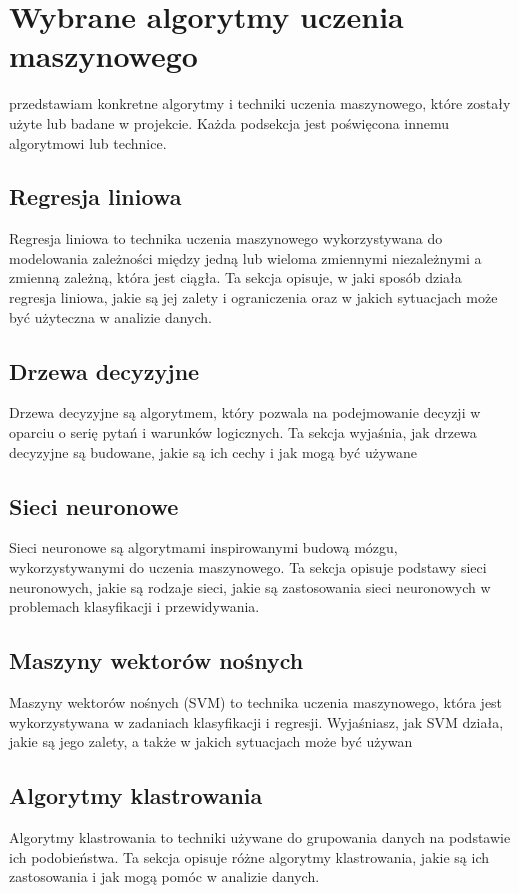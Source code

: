 \newpage %
\section{Wybrane algorytmy uczenia maszynowego}
 przedstawiam konkretne algorytmy i techniki uczenia maszynowego, które zostały użyte lub badane w  projekcie. Każda podsekcja jest poświęcona innemu algorytmowi lub technice. 

\subsection{Regresja liniowa}
Regresja liniowa to technika uczenia maszynowego wykorzystywana do modelowania zależności między jedną lub wieloma zmiennymi niezależnymi a zmienną zależną, która jest ciągła. Ta sekcja opisuje, w jaki sposób działa regresja liniowa, jakie są jej zalety i ograniczenia oraz w jakich sytuacjach może być użyteczna w analizie danych.

\subsection{Drzewa decyzyjne}
 Drzewa decyzyjne są algorytmem, który pozwala na podejmowanie decyzji w oparciu o serię pytań i warunków logicznych. Ta sekcja wyjaśnia, jak drzewa decyzyjne są budowane, jakie są ich cechy i jak mogą być używane 

\subsection{Sieci neuronowe}
Sieci neuronowe są algorytmami inspirowanymi budową mózgu, wykorzystywanymi do uczenia maszynowego. Ta sekcja opisuje podstawy sieci neuronowych, jakie są rodzaje sieci, jakie są zastosowania sieci neuronowych w problemach klasyfikacji i przewidywania.


\subsection{Maszyny wektorów nośnych}
Maszyny wektorów nośnych (SVM) to technika uczenia maszynowego, która jest wykorzystywana w zadaniach klasyfikacji i regresji. Wyjaśniasz, jak SVM działa, jakie są jego zalety, a także w jakich sytuacjach może być używan

\subsection{Algorytmy klastrowania}
Algorytmy klastrowania to techniki używane do grupowania danych na podstawie ich podobieństwa. Ta sekcja opisuje różne algorytmy klastrowania, jakie są ich zastosowania i jak mogą pomóc w analizie danych.

